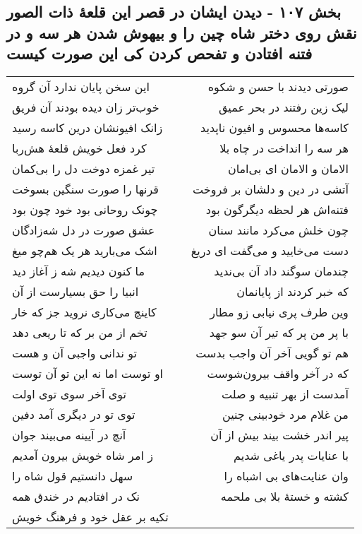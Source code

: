 \begin{center}
\section*{بخش ۱۰۷ - دیدن ایشان در قصر این قلعهٔ ذات الصور نقش روی دختر شاه چین را و بیهوش شدن هر سه و در فتنه افتادن و تفحص کردن کی این صورت کیست}
\label{sec:sh107}
\begin{longtable}{l p{0.5cm} r}
این سخن پایان ندارد آن گروه
&&
صورتی دیدند با حسن و شکوه
\\
خوب‌تر زان دیده بودند آن فریق
&&
لیک زین رفتند در بحر عمیق
\\
زانک افیونشان درین کاسه رسید
&&
کاسه‌ها محسوس و افیون ناپدید
\\
کرد فعل خویش قلعهٔ هش‌ربا
&&
هر سه را انداخت در چاه بلا
\\
تیر غمزه دوخت دل را بی‌کمان
&&
الامان و الامان ای بی‌امان
\\
قرنها را صورت سنگین بسوخت
&&
آتشی در دین و دلشان بر فروخت
\\
چونک روحانی بود خود چون بود
&&
فتنه‌اش هر لحظه دیگرگون بود
\\
عشق صورت در دل شه‌زادگان
&&
چون خلش می‌کرد مانند سنان
\\
اشک می‌بارید هر یک هم‌چو میغ
&&
دست می‌خایید و می‌گفت ای دریغ
\\
ما کنون دیدیم شه ز آغاز دید
&&
چندمان سوگند داد آن بی‌ندید
\\
انبیا را حق بسیارست از آن
&&
که خبر کردند از پایانمان
\\
کاینچ می‌کاری نروید جز که خار
&&
وین طرف پری نیابی زو مطار
\\
تخم از من بر که تا ریعی دهد
&&
با پر من پر که تیر آن سو جهد
\\
تو ندانی واجبی آن و هست
&&
هم تو گویی آخر آن واجب بدست
\\
او توست اما نه این تو آن توست
&&
که در آخر واقف بیرون‌شوست
\\
توی آخر سوی توی اولت
&&
آمدست از بهر تنبیه و صلت
\\
توی تو در دیگری آمد دفین
&&
من غلام مرد خودبینی چنین
\\
آنچ در آیینه می‌بیند جوان
&&
پیر اندر خشت بیند بیش از آن
\\
ز امر شاه خویش بیرون آمدیم
&&
با عنایات پدر یاغی شدیم
\\
سهل دانستیم قول شاه را
&&
وان عنایت‌های بی اشباه را
\\
نک در افتادیم در خندق همه
&&
کشته و خستهٔ بلا بی ملحمه
\\
تکیه بر عقل خود و فرهنگ خویش

\end{longtable}
\end{center}
